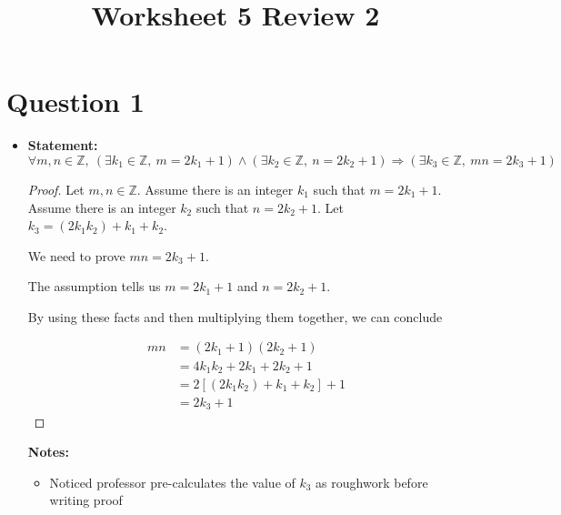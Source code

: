 \documentclass[12pt]{article}
\begin{document}
\title{Worksheet 5 Review 2}
\maketitle

\section*{Question 1}
\begin{itemize}

    \item

    \textbf{Statement:} $\forall m,n \in \mathbb{Z},\:(\exists k_1 \in \mathbb{Z},\:m=2k_1+1)
    \land (\exists k_2 \in \mathbb{Z},\:n = 2k_2 + 1) \Rightarrow (\exists k_3 \in \mathbb{Z},\:mn = 2k_3 + 1)$

    \begin{proof}

    Let $m,n \in \mathbb{Z}$. Assume there is an integer $k_1$ such that $m = 2k_1 + 1$.
    Assume there is an integer $k_2$ such that $n = 2k_2 + 1$. Let $k_3 = (2k_1k_2) + k_1 + k_2$.

    \bigskip

    We need to prove $mn = 2k_3 + 1$.

    \bigskip

    The assumption tells us $m = 2k_1 + 1$ and $n = 2k_2 + 1$.

    \bigskip

    By using these facts and then multiplying them together, we can conclude

    \begin{align}
        mn &= (2k_1 + 1)(2k_2 + 1)\\
        &= 4k_1k_2 + 2k_1 + 2k_2 + 1\\
        &= 2[(2k_1k_2) + k_1 + k_2] + 1\\
        &= 2k_3 + 1
    \end{align}

    \end{proof}

    \bigskip

    \textbf{Notes:}

    \begin{itemize}
        \item Noticed professor pre-calculates the value of $k_3$ as roughwork
        before writing proof
    \end{itemize}



\end{itemize}
\end{document}
